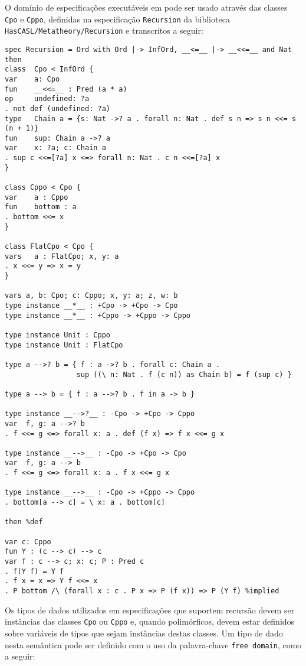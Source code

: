 O domínio de especificações executáveis em \HasCASL pode ser usado através das classes \Verb.Cpo. e \Verb.Cppo., definidas na especificação \Verb.Recursion. da biblioteca \Verb.HasCASL/Metatheory/Recursion. e transcritos a seguir:

\begin{Verbatim}
spec Recursion = Ord with Ord |-> InfOrd, __<=__ |-> __<<=__ and Nat then
class  Cpo < InfOrd {
var    a: Cpo
fun    __<<=__ : Pred (a * a)
op     undefined: ?a
. not def (undefined: ?a)
type   Chain a = {s: Nat ->? a . forall n: Nat . def s n => s n <<= s (n + 1)}
fun    sup: Chain a ->? a
var    x: ?a; c: Chain a
. sup c <<=[?a] x <=> forall n: Nat . c n <<=[?a] x
}

class Cppo < Cpo {
var    a : Cppo
fun    bottom : a
. bottom <<= x
}

class FlatCpo < Cpo {
vars   a : FlatCpo; x, y: a
. x <<= y => x = y
}

vars a, b: Cpo; c: Cppo; x, y: a; z, w: b
type instance __*__ : +Cpo -> +Cpo -> Cpo
type instance __*__ : +Cppo -> +Cppo -> Cppo

type instance Unit : Cppo
type instance Unit : FlatCpo

type a -->? b = { f : a ->? b . forall c: Chain a .
                 sup ((\ n: Nat . f (c n)) as Chain b) = f (sup c) }

type a --> b = { f : a -->? b . f in a -> b }

type instance __-->?__ : -Cpo -> +Cpo -> Cppo
var  f, g: a -->? b
. f <<= g <=> forall x: a . def (f x) => f x <<= g x

type instance __-->__ : -Cpo -> +Cpo -> Cpo
var  f, g: a --> b
. f <<= g <=> forall x: a . f x <<= g x

type instance __-->__ : -Cpo -> +Cppo -> Cppo
. bottom[a --> c] = \ x: a . bottom[c]

then %def

var c: Cppo
fun Y : (c --> c) --> c
var f : c --> c; x: c; P : Pred c
. f(Y f) = Y f
. f x = x => Y f <<= x
. P bottom /\ (forall x : c . P x => P (f x)) => P (Y f) %implied
\end{Verbatim}

Os tipos de dados utilizados em especificações que suportem recursão devem ser instâncias das classes \Verb.Cpo. ou \Verb.Cppo. e, quando polimórficos, devem estar definidos sobre variáveis de tipos que sejam instâncias destas classes.
Um tipo de dado nesta semântica pode ser definido com o uso da palavra-chave \Verb.free domain., como a seguir:

